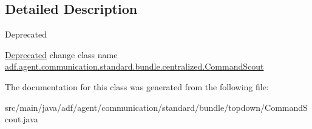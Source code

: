 \subsection{Detailed Description}
\begin{DoxyRefDesc}{Deprecated}
\item[\hyperlink{deprecated__deprecated000004}{Deprecated}]change class name \hyperlink{classadf_1_1agent_1_1communication_1_1standard_1_1bundle_1_1centralized_1_1CommandScout}{adf.\+agent.\+communication.\+standard.\+bundle.\+centralized.\+Command\+Scout} \end{DoxyRefDesc}


The documentation for this class was generated from the following file\+:\begin{DoxyCompactItemize}
\item 
src/main/java/adf/agent/communication/standard/bundle/topdown/Command\+Scout.\+java\end{DoxyCompactItemize}
